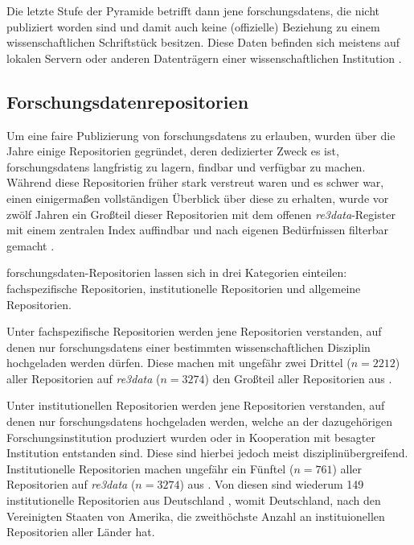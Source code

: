 Die letzte Stufe der Pyramide betrifft dann jene \glspl{forschungsdaten}, die nicht publiziert worden sind und damit auch keine (offizielle) Beziehung zu einem wissenschaftlichen Schriftstück besitzen.
Diese Daten befinden sich meistens auf lokalen Servern oder anderen Datenträgern einer wissenschaftlichen Institution \autocite{ReillyEtAl2011}.


\subsection{Forschungsdatenrepositorien}\label{sec:forschungsstand-basics-repositories}
Um eine \gls{fair}e Publizierung von \glspl{forschungsdaten} zu erlauben, wurden über die Jahre einige Repositorien gegründet, deren dedizierter Zweck es ist, \glspl{forschungsdaten} langfristig zu lagern, findbar und verfügbar zu machen.
Während diese Repositorien früher stark verstreut waren und es schwer war, einen einigermaßen vollständigen Überblick über diese zu erhalten, wurde vor zwölf Jahren ein Großteil dieser Repositorien mit dem offenen \textit{re3data}-Register mit einem zentralen Index auffindbar und nach eigenen Bedürfnissen filterbar gemacht \autocite{Pampel2013}.

\gls{forschungsdaten}-Repositorien lassen sich in drei Kategorien einteilen:
fachspezifische Repositorien, institutionelle Repositorien und allgemeine Repositorien.

Unter fachspezifische Repositorien werden jene Repositorien verstanden, auf denen nur \glspl{forschungsdaten} einer bestimmten wissenschaftlichen Disziplin hochgeladen werden dürfen.
Diese machen mit ungefähr zwei Drittel ($n=\num{2212}$) aller Repositorien auf \textit{re3data} ($n=\num{3274}$) den Großteil aller Repositorien aus \autocite{Khan2024}.

Unter institutionellen Repositorien werden jene Repositorien verstanden, auf denen nur \glspl{forschungsdaten} hochgeladen werden, welche an der dazugehörigen Forschungsinstitution produziert wurden oder in Kooperation mit besagter Institution entstanden sind.
Diese sind hierbei jedoch meist disziplinübergreifend.
Institutionelle Repositorien machen ungefähr ein Fünftel ($n=\num{761}$) aller Repositorien auf \textit{re3data}  ($n=\num{3274}$) aus \autocite{Khan2024}.
Von diesen sind wiederum \num{149} institutionelle Repositorien aus Deutschland \autocite{re3data-institutional}, womit Deutschland, nach den Vereinigten Staaten von Amerika, die zweithöchste Anzahl an instituionellen Repositorien aller Länder hat.

